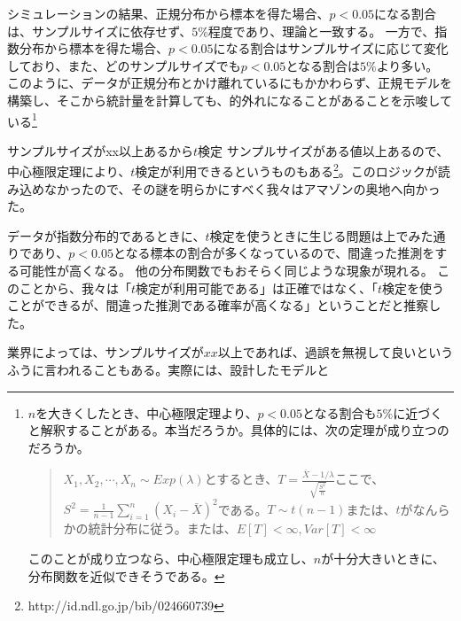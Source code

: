 シミュレーションの結果、正規分布から標本を得た場合、$p<0.05$になる割合は、サンプルサイズに依存せず、$5\%$程度であり、理論と一致する。
一方で、指数分布から標本を得た場合、$p<0.05$になる割合はサンプルサイズに応じて変化しており、また、どのサンプルサイズでも$p<0.05$となる割合は$5\%$より多い。
このように、データが正規分布とかけ離れているにもかかわらず、正規モデルを構築し、そこから統計量を計算しても、的外れになることがあることを示唆している\footnote{$n$を大きくしたとき、中心極限定理より、$p<0.05$となる割合も$5\%$に近づくと解釈することがある。本当だろうか。具体的には、次の定理が成り立つのだろうか。
\begin{quote}
\begin{theo}
    $X_1,X_2,\cdots,X_n \sim Exp(\lambda)$とするとき、$T=\frac{\bar{X}-1/\lambda}{\sqrt{\frac{S^2}{n}}}$ここで、$S^2=\frac{1}{n-1}\sum_{i=1}^n(X_i-\bar{X})^2$である。$T\sim t(n-1)$または、$t$がなんらかの統計分布に従う。または、$E[T]<\infty,Var[T]<\infty$
\end{theo}
\end{quote}
このことが成り立つなら、中心極限定理も成立し、$n$が十分大きいときに、分布関数を近似できそうである。
}
\fi
\begin{SMbox}{サンプルサイズがxx以上あるから$t$検定}
        サンプルサイズがある値以上あるので、中心極限定理により、$t$検定が利用できるというものもある\footnote{http://id.ndl.go.jp/bib/024660739}。このロジックが読み込めなかったので、その謎を明らかにすべく我々はアマゾンの奥地へ向かった。

        データが指数分布的であるときに、$t$検定を使うときに生じる問題は上でみた通りであり、$p<0.05$となる標本の割合が多くなっているので、間違った推測をする可能性が高くなる。
        他の分布関数でもおそらく同じような現象が現れる。
        このことから、我々は「$t$検定が利用可能である」は正確ではなく、「$t$検定を使うことができるが、間違った推測である確率が高くなる」ということだと推察した。

        業界によっては、サンプルサイズが$xx$以上であれば、過誤を無視して良いというふうに言われることもある。実際には、設計したモデルと
\end{SMbox}

